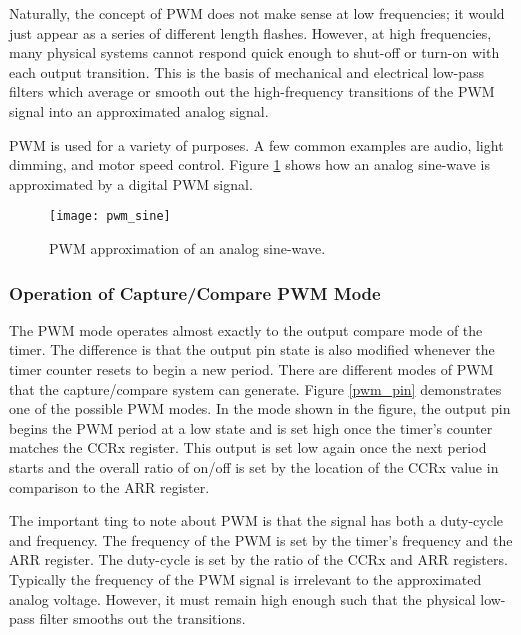 \documentclass[11pt,fleqn]{book} %
\begin{document}
    Naturally, the concept of PWM does not make sense at low frequencies; it would just appear as a series of different length flashes. However, at high frequencies, many physical systems cannot respond quick enough to shut-off or turn-on with each output transition. This is the basis of mechanical and electrical low-pass filters which average or smooth out the high-frequency transitions of the PWM signal into an approximated analog signal.
    
    PWM is used for a variety of purposes. A few common examples are audio, light dimming, and motor speed control. Figure \ref{pwm_sine} shows how an analog sine-wave is approximated by a digital PWM signal. 
    
%        
    \begin{figure}[]
        \centering\texttt{[image: pwm\_sine]}
        \caption{PWM approximation of an analog sine-wave.}
        \label{pwm_sine}
    \end{figure}
    
    \subsubsection{Operation of Capture/Compare PWM Mode}
    The PWM mode operates almost exactly to the output compare mode of the timer. The difference is that the output pin state is also modified whenever the timer counter resets to begin a new period. There are different modes of PWM that the capture/compare system can generate. Figure \ref{pwm_pin} demonstrates one of the possible PWM modes. In the mode shown in the figure, the output pin begins the PWM period at a low state and is set high once the timer's counter matches the CCRx register. This output is set low again once the next period starts and the overall ratio of on/off is set by the location of the CCRx value in comparison to the ARR register. 
   
   The important ting to note about PWM is that the signal has both a duty-cycle and frequency. The frequency of the PWM is set by the timer's frequency and the ARR register. The duty-cycle is set by the ratio of the CCRx and ARR registers. Typically the frequency of the PWM signal is irrelevant to the approximated analog voltage. However, it must remain high enough such that the physical low-pass filter smooths out the transitions. 
   
\end{document}
